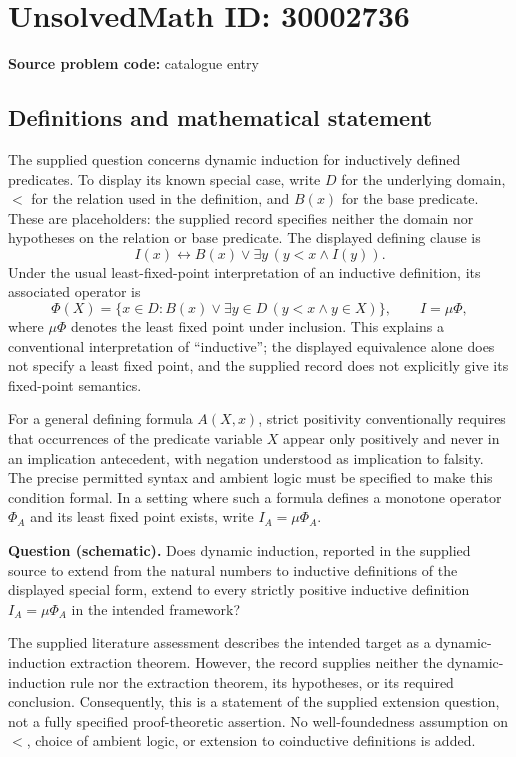 \documentclass[11pt]{article}
\begin{document}
\section*{UnsolvedMath ID: 30002736}
\textbf{Source problem code:} catalogue entry
\subsection{Definitions and mathematical statement}
The supplied question concerns dynamic induction for inductively defined predicates. To display its known special case, write \(D\) for the underlying domain, \(<\) for the relation used in the definition, and \(B(x)\) for the base predicate. These are placeholders: the supplied record specifies neither the domain nor hypotheses on the relation or base predicate. The displayed defining clause is
\[
I(x)\leftrightarrow B(x)\lor\exists y\,(y<x\land I(y)).
\]
Under the usual least-fixed-point interpretation of an inductive definition, its associated operator is
\[
\Phi(X)=\{x\in D:B(x)\lor\exists y\in D\,(y<x\land y\in X)\},
\qquad I=\mu\Phi,
\]
where \(\mu\Phi\) denotes the least fixed point under inclusion. This explains a conventional interpretation of ``inductive''; the displayed equivalence alone does not specify a least fixed point, and the supplied record does not explicitly give its fixed-point semantics.

For a general defining formula \(A(X,x)\), strict positivity conventionally requires that occurrences of the predicate variable \(X\) appear only positively and never in an implication antecedent, with negation understood as implication to falsity. The precise permitted syntax and ambient logic must be specified to make this condition formal. In a setting where such a formula defines a monotone operator \(\Phi_A\) and its least fixed point exists, write \(I_A=\mu\Phi_A\).

\textbf{Question (schematic).} Does dynamic induction, reported in the supplied source to extend from the natural numbers to inductive definitions of the displayed special form, extend to every strictly positive inductive definition \(I_A=\mu\Phi_A\) in the intended framework?

The supplied literature assessment describes the intended target as a dynamic-induction extraction theorem. However, the record supplies neither the dynamic-induction rule nor the extraction theorem, its hypotheses, or its required conclusion. Consequently, this is a statement of the supplied extension question, not a fully specified proof-theoretic assertion. No well-foundedness assumption on \(<\), choice of ambient logic, or extension to coinductive definitions is added.
\end{document}

